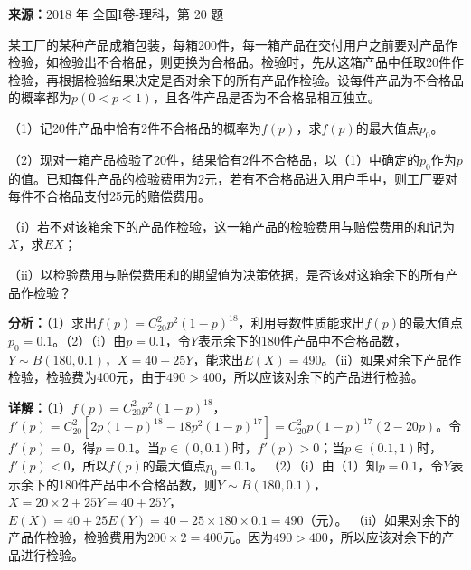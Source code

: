 \begin{question}[points=12]
\textbf{来源：}2018 年 全国I卷-理科，第 20 题\par
某工厂的某种产品成箱包装，每箱200件，每一箱产品在交付用户之前要对产品作检验，如检验出不合格品，则更换为合格品。检验时，先从这箱产品中任取20件作检验，再根据检验结果决定是否对余下的所有产品作检验。设每件产品为不合格品的概率都为$p(0<p<1)$，且各件产品是否为不合格品相互独立。

（1）记20件产品中恰有2件不合格品的概率为$f(p)$，求$f(p)$的最大值点$p_0$。

（2）现对一箱产品检验了20件，结果恰有2件不合格品，以（1）中确定的$p_0$作为$p$的值。已知每件产品的检验费用为2元，若有不合格品进入用户手中，则工厂要对每件不合格品支付25元的赔偿费用。

（i）若不对该箱余下的产品作检验，这一箱产品的检验费用与赔偿费用的和记为$X$，求$EX$；

（ii）以检验费用与赔偿费用和的期望值为决策依据，是否该对这箱余下的所有产品作检验？
\begin{solution}

\textbf{分析：}（1）求出$f(p)=C_{20}^2p^2(1-p)^{18}$，利用导数性质能求出$f(p)$的最大值点$p_0=0.1$。（2）（i）由$p=0.1$，令$Y$表示余下的180件产品中不合格品数，$Y\sim B(180,0.1)$，$X=40+25Y$，能求出$E(X)=490$。（ii）如果对余下产品作检验，检验费为400元，由于$490>400$，所以应该对余下的产品进行检验。

\textbf{详解：}（1）$f(p)=C_{20}^2p^2(1-p)^{18}$，$f'(p)=C_{20}^2[2p(1-p)^{18}-18p^2(1-p)^{17}]=C_{20}^2p(1-p)^{17}(2-20p)$。令$f'(p)=0$，得$p=0.1$。当$p\in(0,0.1)$时，$f'(p)>0$；当$p\in(0.1,1)$时，$f'(p)<0$，所以$f(p)$的最大值点$p_0=0.1$。
（2）（i）由（1）知$p=0.1$，令$Y$表示余下的180件产品中不合格品数，则$Y\sim B(180,0.1)$，$X=20\times2+25Y=40+25Y$，$E(X)=40+25E(Y)=40+25\times180\times0.1=490$（元）。
（ii）如果对余下的产品作检验，检验费用为$200\times2=400$元。因为$490>400$，所以应该对余下的产品进行检验。
\end{solution}
\end{question}

